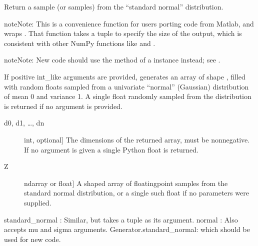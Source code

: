 \documentclass[letterpaper,10pt,english]{sphinxmanual}
\begin{document}
\begin{fulllineitems}
\label{\detokenize{curve_statistics:curve_stats.randn}}
Return a sample (or samples) from the “standard normal” distribution.

\begin{sphinxadmonition}{note}{Note:}
This is a convenience function for users porting code from Matlab,
and wraps . That function takes a
tuple to specify the size of the output, which is consistent with
other NumPy functions like  and .
\end{sphinxadmonition}

\begin{sphinxadmonition}{note}{Note:}
New code should use the  method of a 
instance instead; see .
\end{sphinxadmonition}

If positive int\_like arguments are provided,  generates an array
of shape , filled
with random floats sampled from a univariate “normal” (Gaussian)
distribution of mean 0 and variance 1. A single float randomly sampled
from the distribution is returned if no argument is provided.
\begin{description}
\item[{d0, d1, …, dn}] \leavevmode{[}int, optional{]}
The dimensions of the returned array, must be non\sphinxhyphen{}negative.
If no argument is given a single Python float is returned.

\end{description}
\begin{description}
\item[{Z}] \leavevmode{[}ndarray or float{]}
A \sphinxhyphen{}shaped array of floating\sphinxhyphen{}point samples from
the standard normal distribution, or a single such float if
no parameters were supplied.

\end{description}

standard\_normal : Similar, but takes a tuple as its argument.
normal : Also accepts mu and sigma arguments.
Generator.standard\_normal: which should be used for new code.


\end{fulllineitems}
\end{document}
